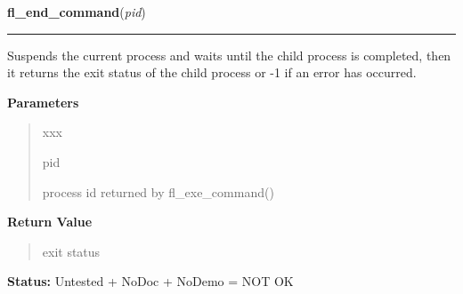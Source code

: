 \hspace{.8\funcindent}\begin{boxedminipage}{\funcwidth}

    \raggedright \textbf{fl\_end\_command}(\textit{pid})

    \vspace{-1.5ex}

    \rule{\textwidth}{0.5\fboxrule}
\setlength{\parskip}{2ex}
    Suspends the current process and waits until the child process is 
    completed, then it returns the exit status of the child process or -1 
    if an error has occurred.

\setlength{\parskip}{1ex}
      \textbf{Parameters}
      \vspace{-1ex}

      \begin{quote}
        \begin{Ventry}{xxx}

          \item[pid]

          process id returned by fl\_exe\_command()

        \end{Ventry}

      \end{quote}

      \textbf{Return Value}
    \vspace{-1ex}

      \begin{quote}
      exit status

      \end{quote}

\textbf{Status:} Untested + NoDoc + NoDemo = NOT OK



    \end{boxedminipage}

    \label{xformslib:flgoodies:fl_end_command}

    \vspace{0.5ex}

